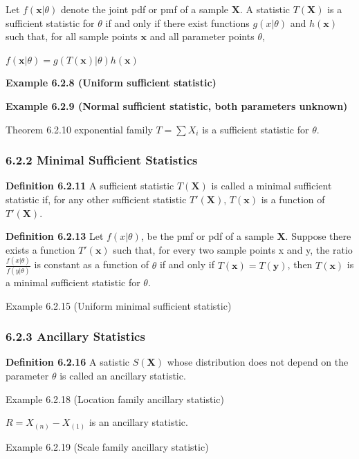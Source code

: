 \documentclass[10pt,twocolumn,portrait]{article}
\begin{document}
Let \(f(\mathbf{x}|\theta)\) denote the joint pdf or pmf of a sample
\(\mathbf{X}\). A statistic \(T(\mathbf{X})\) is a sufficient statistic
for \(\theta\) if and only if there exist functions \(g(x|\theta)\) and
\(h(\mathbf{x})\) such that, for all sample points \(\mathbf{x}\) and
all parameter points \(\theta\),

\(f(\mathbf{x}|\theta)= g(T(\mathbf{x})|\theta)h(\mathbf{x})\)

\textbf{Example 6.2.8 (Uniform sufficient statistic)}

\textbf{Example 6.2.9 (Normal sufficient statistic, both parameters
unknown)}

Theorem 6.2.10 exponential family \(T=\sum X_i\) is a sufficient
statistic for \(\theta\).

\hypertarget{Min-Suff}{%
\subsubsection{6.2.2 Minimal Sufficient Statistics}\label{Min-Suff}}

\textbf{Definition 6.2.11} A sufficient statistic \(T(\mathbf{X})\) is
called a minimal sufficient statistic if, for any other sufficient
statistic \(T'(\mathbf{X})\), \(T(\mathbf{x})\) is a function of
\(T'(\mathbf{X})\).

\textbf{Definition 6.2.13} Let \(f(x|\theta)\), be the pmf or pdf of a
sample \(\mathbf{X}\). Suppose there exists a function
\(T'(\mathbf{x})\) such that, for every two sample points x and y, the
ratio \(\frac{f(x|\theta)}{f(y|\theta)}\) is constant as a function of
\(\theta\) if and only if \(T(\mathbf{x})=T(\mathbf{y})\), then
\(T(\mathbf{x})\) is a minimal sufficient statistic for \(\theta\).

Example 6.2.15 (Uniform minimal sufficient statistic)

\hypertarget{ancillary}{%
\subsubsection{6.2.3 Ancillary Statistics}\label{ancillary}}

\textbf{Definition 6.2.16} A satistic \(S(\mathbf{X})\) whose
distribution does not depend on the parameter \(\theta\) is called an
ancillary statistic.

Example 6.2.18 (Location family ancillary statistic)

\(R=X_{(n)}-X_{(1)}\) is an ancillary statistic.

Example 6.2.19 (Scale family ancillary statistic)
\end{document}
